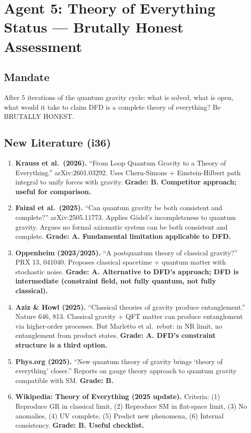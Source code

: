 \documentclass[11pt,a4paper]{article}
\begin{document}
\newpage
\section{Agent 5: Theory of Everything Status --- Brutally Honest Assessment}
\label{sec:agent5}

\subsection{Mandate}

After 5 iterations of the quantum gravity cycle: what is solved, what is open, what would it take to claim DFD is a complete theory of everything? Be BRUTALLY HONEST.

\subsection{New Literature (i36)}

\begin{enumerate}
\item \textbf{Krauss et al.\ (2026).} ``From Loop Quantum Gravity to a Theory of Everything.'' arXiv:2601.03292. Uses Chern-Simons + Einstein-Hilbert path integral to unify forces with gravity. \textbf{Grade: B. Competitor approach; useful for comparison.}

\item \textbf{Faizal et al.\ (2025).} ``Can quantum gravity be both consistent and complete?'' arXiv:2505.11773. Applies G\"odel's incompleteness to quantum gravity. Argues no formal axiomatic system can be both consistent and complete. \textbf{Grade: A. Fundamental limitation applicable to DFD.}

\item \textbf{Oppenheim (2023/2025).} ``A postquantum theory of classical gravity?'' PRX 13, 041040. Proposes classical spacetime + quantum matter with stochastic noise. \textbf{Grade: A. Alternative to DFD's approach; DFD is intermediate (constraint field, not fully quantum, not fully classical).}

\item \textbf{Aziz \& Howl (2025).} ``Classical theories of gravity produce entanglement.'' Nature 646, 813. Classical gravity + QFT matter can produce entanglement via higher-order processes. But Marletto et al.\ rebut: in NR limit, no entanglement from product states. \textbf{Grade: A. DFD's constraint structure is a third option.}

\item \textbf{Phys.org (2025).} ``New quantum theory of gravity brings `theory of everything' closer.'' Reports on gauge theory approach to quantum gravity compatible with SM. \textbf{Grade: B.}

\item \textbf{Wikipedia: Theory of Everything (2025 update).} Criteria: (1) Reproduce GR in classical limit, (2) Reproduce SM in flat-space limit, (3) No anomalies, (4) UV complete, (5) Predict new phenomena, (6) Internal consistency. \textbf{Grade: B. Useful checklist.}
\end{enumerate}
\end{document}
